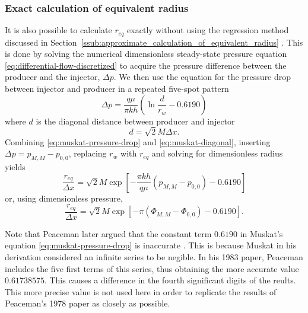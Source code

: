 \subsubsection{Exact calculation of equivalent radius} %
\label{ssub:exact_calculation_of_equivalent_radius}
It is also possible to calculate $r_{eq}$ exactly without using the regression method discussed in Section~\ref{ssub:approximate_calculation_of_equivalent_radius} \cite{Peaceman1978Interpretation}. This is done by solving the numerical dimensionless steady-state pressure equation \eqref{eq:differential-flow-discretized} to acquire the pressure difference between the producer and the injector, $\Delta p$. We then use the equation for the pressure drop between injector and producer in a repeated five-spot pattern \cite{Muskat1946Flow}
\begin{equation}
    \label{eq:muskat-pressure-drop}
    \Delta p = \frac{q\mu}{\pi k h} \left( \ln \frac{d}{r_w} - 0.6190 \right)
\end{equation}
where $d$ is the diagonal distance between producer and injector
\begin{equation}
    \label{eq:muskat-diagonal}
    d = \sqrt{2} M \Delta x.
\end{equation}
Combining \eqref{eq:muskat-pressure-drop} and \eqref{eq:muskat-diagonal}, inserting $\Delta p = p_{M,M} - p_{0,0}$, replacing $r_w$ with $r_{eq}$ and solving for dimensionless radius yields
\begin{equation}
    \label{eq:peaceman77-eqrad-exact}
    \frac{r_{eq}}{\Delta x} = \sqrt{2}M \exp\left[- \frac{\pi k h}{q\mu} \left( p_{M,M} - p_{0,0} \right) - 0.6190 \right]
\end{equation}
or, using dimensionless pressure,
\begin{equation}
    \label{eq:peaceman77-eqrad-exact-dimensionless}
    \frac{r_{eq}}{\Delta x} = \sqrt{2}M \exp\left[- \pi \left( \Phi_{M,M} - \Phi_{0,0} \right) - 0.6190 \right].
\end{equation}

Note that Peaceman later argued that the constant term $0.6190$ in Muskat's equation \eqref{eq:muskat-pressure-drop} is inaccurate \cite{Peaceman1983Interpretation}. This is because Muskat \cite{Muskat1946Flow} in his derivation considered an infinite series to be negible. In his 1983 paper, Peaceman includes the five first terms of this series, thus obtaining the more accurate value $0.61738575$. This causes a difference in the fourth significant digits of the reults. This more precise value is not used here in order to replicate the results of Peaceman's 1978 \cite{Peaceman1978Interpretation} paper as closely as possible.




